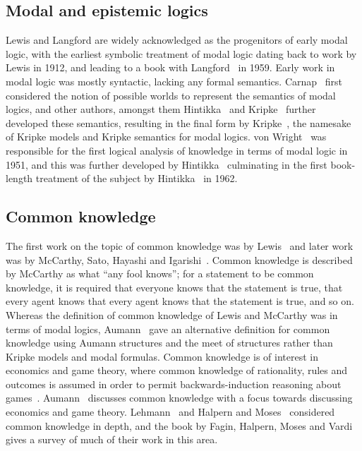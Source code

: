 \subsection{Modal and epistemic logics}

Lewis and Langford are widely acknowledged as the progenitors of early modal logic, with the earliest symbolic treatment of modal logic dating back to work by Lewis in 1912, and leading to a book with Langford~\cite{langford:1959} in 1959.
Early work in modal logic was mostly syntactic, lacking any formal semantics.
Carnap~\cite{carnap:1946, carnap:1947} first considered the notion of possible worlds to represent the semantics of modal logics, and other authors, amongst them Hintikka~\cite{hintikka:1957, hintikka:1961} and Kripke~\cite{kripke:1959} further developed these semantics, resulting in the final form by Kripke~\cite{kripke:1963}, the namesake of Kripke models and Kripke semantics for modal logics.
von Wright~\cite{vonwright:1951} was responsible for the first logical analysis of knowledge in terms of modal logic in 1951, and this was further developed by Hintikka~\cite{hintikka:1957,hintikka:1961} culminating in the first book-length treatment of the subject by Hintikka~\cite{hintikka:1962} in 1962.

\subsection{Common knowledge}

The first work on the topic of common knowledge was by Lewis~\cite{lewis:1969} and later work was by McCarthy, Sato, Hayashi and Igarishi~\cite{mccarthy:1979}.
Common knowledge is described by McCarthy as what ``any fool knows''; for a statement to be common knowledge, it is required that everyone knows that the statement is true, that every agent knows that every agent knows that the statement is true, and so on.
Whereas the definition of common knowledge of Lewis and McCarthy was in terms of modal logics, Aumann~\cite{aumann:1976} gave an alternative definition for common knowledge using Aumann structures and the meet of structures rather than Kripke models and modal formulas.
Common knowledge is of interest in economics and game theory, where common knowledge of rationality, rules and outcomes is assumed in order to permit backwards-induction reasoning about games~\cite{aumann:1995}.
Aumann~\cite{aumann:1976} discusses common knowledge with a focus towards discussing economics and game theory. 
Lehmann~\cite{lehmann:1984} and Halpern and Moses~\cite{halpern:1985} considered common knowledge in depth, and the book by Fagin, Halpern, Moses and Vardi~\cite{fagin:1995} gives a survey of much of their work in this area.

